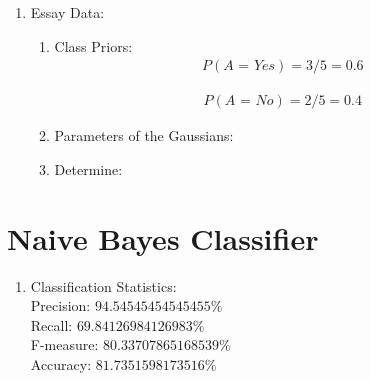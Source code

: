 \documentclass[12pt]{article}
\begin{document}
\begin{enumerate}
\begin{enumerate}
			
		\end{enumerate}
		

		
		
		\item Essay Data:\\
		
		\begin{enumerate}
			
			\item Class Priors:\\
			
			\begin{equation}
				\begin{split}
					P(\textit{A = Yes}) = 3/5 = 0.6
				\end{split}
			\end{equation}
		
			\begin{equation}
				\begin{split}
					P(\textit{A = No}) = 2/5 = 0.4
				\end{split}
			\end{equation}
			
			
			
			\item Parameters of the Gaussians:\\
			
			
			
			\item Determine:\\
			
			
		\end{enumerate}
		
		
	\end{enumerate}
	
	\newpage
	
	\section{Naive Bayes Classifier}
	
	\begin{enumerate}
		
		\item Classification Statistics:\\
		
		Precision: $94.54545454545455\%$ \\
		Recall: $69.84126984126983\%$ \\
		F-measure: $80.33707865168539\%$ \\
		Accuracy: $81.7351598173516\%$ \\

		
	\end{enumerate}
	
\end{document}
